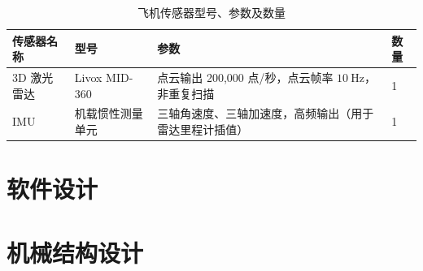 \begin{table}[hbtp!]
    \centering
    \begin{tabular}{ m{3cm}  m{4cm}  m{6cm} m{1cm}}
    \toprule
      传感器名称 & 型号 & 参数 & 数量 \\
        \midrule
        3D 激光雷达 & Livox MID-360 & 点云输出 200,000 点/秒，点云帧率 $\qty{10}{\Hz}$，非重复扫描 & 1 \\   
         \midrule
         IMU & 机载惯性测量单元 & 三轴角速度、三轴加速度，高频输出（用于雷达里程计插值） & 1 \\
    \toprule
    \end{tabular}
    \caption{飞机传感器型号、参数及数量}
    \label{tab:飞机传感器型号、参数及数量}
\end{table}





\section{软件设计}


\section{机械结构设计}
